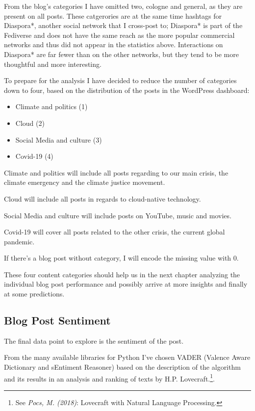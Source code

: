 From the blog's categories I have omitted two, cologne and general, as they are present on all posts. These catgerories are at the same time hashtags for Diaspora*, another social network that I cross-post to; Diaspora* is part of the Fediverse and does not have the same reach as the more popular commercial networks and thus did not appear in the statistics above. Interactions on Diaspora* are far fewer than on the other networks, but they tend to be more thoughtful and more interesting.

To prepare for the analysis I have decided to reduce the number of categories down to four, based on the distribution of the posts in the WordPress dashboard:

\begin{itemize}
\item Climate and politics (1)
\item Cloud (2)
\item Social Media and culture (3)
\item Covid-19 (4)
\end{itemize}

Climate and politics will include all posts regarding to our main crisis, the climate emergency and the climate justice movement.

Cloud will include all posts in regards to cloud-native technology.

Social Media and culture will include posts on YouTube, music and movies.

Covid-19 will cover all posts related to the other crisis, the current global pandemic.

 If there's a blog post without category, I will encode the missing value with 0.

These four content categories should help us in the next chapter analyzing the individual blog post performance and possibly arrive at more insights and finally at some predictions.

\subsection{Blog Post Sentiment}

The final data point to explore is the sentiment of the post.

From the many available libraries for Python I've chosen VADER (Valence Aware Dictionary and sEntiment Reasoner) based on the description of the algorithm and its results in an analysis and ranking of texts by H.P. Lovecraft.\footnote{See \textit{Pocs, M. (2018)}: Lovecraft with Natural Language Processing.\cite{lovecraftAnalysis}}.

